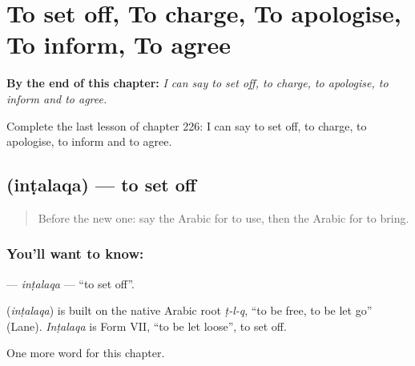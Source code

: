 
\chapter{To set off, To charge, To apologise, To inform, To agree}
\label{ch:ar-to-set-off-to-charge-to-apologise-to-inform-to-agree}

\begin{chapteropening}
\textbf{By the end of this chapter:} \emph{I can say to set off, to charge, to apologise, to inform and to agree.}

Complete the last lesson of chapter 226: I can say to set off, to charge, to apologise, to inform and to agree.
\end{chapteropening}

\section[\texorpdfstring{\ar{انطلق} (inṭalaqa)}{انطلق (inṭalaqa)}]{ (inṭalaqa) — to set off}

\label{lesson:AR-C226-intalaqa}



\begin{quote}
Before the new one: say the Arabic for to use, then the Arabic for to bring.
\end{quote}

\subsection*{You'll want to know: }
\textbf{} — \emph{inṭalaqa} — \textquotedblleft{}to set off\textquotedblright{}.

\begin{cousinweb}
\textbf{} (\emph{inṭalaqa}) is built on the native Arabic root \emph{ṭ-l-q}, \textquotedblleft{}to be free, to be let go\textquotedblright{} (Lane). \emph{Inṭalaqa} is Form VII, \textquotedblleft{}to be let loose\textquotedblright{}, to set off.
\end{cousinweb}

\begin{grammarlens}[title={What you've built}]
One more word for this chapter.
\end{grammarlens}

